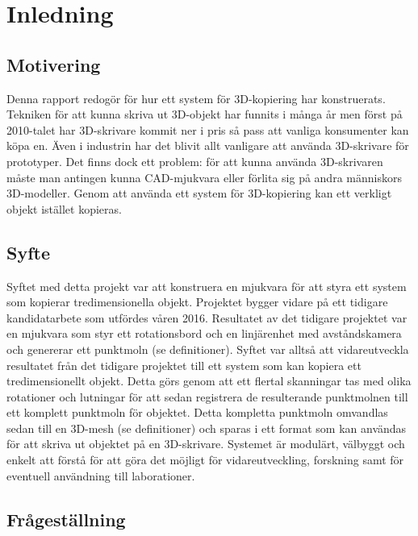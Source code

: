 \chapter{Inledning}
\label{cha:introduction}

\section{Motivering}
\label{sec:motivation}

Denna rapport redogör för hur ett system för 3D-kopiering har konstruerats. Tekniken för att kunna skriva ut 3D-objekt har funnits i många år men först på 2010-talet har 3D-skrivare kommit ner i pris så pass att vanliga konsumenter kan köpa en. Även i industrin har det blivit allt vanligare att använda 3D-skrivare för prototyper. Det finns dock ett problem: för att kunna använda 3D-skrivaren måste man antingen kunna CAD-mjukvara eller förlita sig på andra människors 3D-modeller. Genom att använda ett system för 3D-kopiering kan ett verkligt objekt istället kopieras.


\section{Syfte}
\label{sec:aim}

Syftet med detta projekt var att konstruera en mjukvara för att styra ett system som kopierar tredimensionella objekt. Projektet bygger vidare på ett tidigare kandidatarbete som utfördes våren 2016. Resultatet av det tidigare projektet var en mjukvara som styr ett rotationsbord och en linjärenhet med avståndskamera och genererar ett punktmoln (se definitioner). Syftet var alltså att vidareutveckla resultatet från det tidigare projektet till ett system som kan kopiera ett tredimensionellt objekt. Detta görs genom att ett flertal skanningar tas med olika rotationer och lutningar för att sedan registrera de resulterande punktmolnen till ett komplett punktmoln för objektet. Detta kompletta punktmoln omvandlas sedan till en 3D-mesh (se definitioner) och sparas i ett format som kan användas för att skriva ut objektet på en 3D-skrivare. Systemet är modulärt, välbyggt och enkelt att förstå för att göra det möjligt för vidareutveckling, forskning samt för eventuell användning till laborationer.   


\section{Frågeställning}
\label{sec:research-questions}

